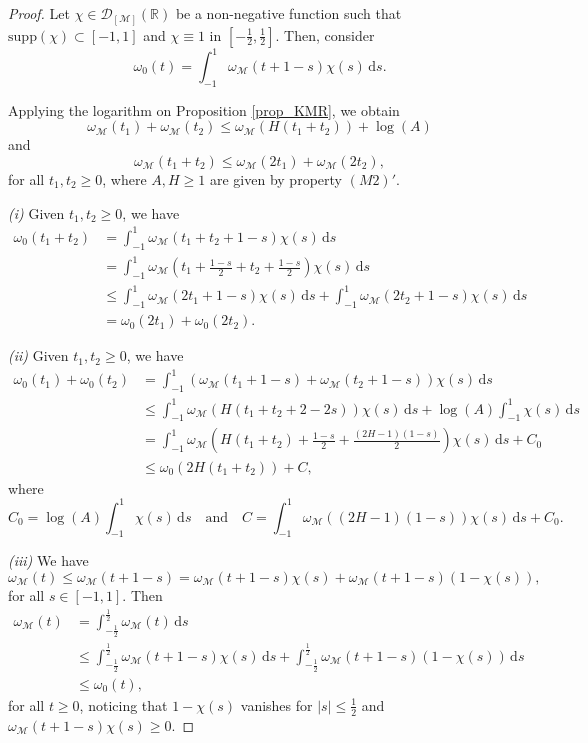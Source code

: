 \documentclass[11pt,reqno]{amsart}
\numberwithin{equation}{section}
\newcommand{\R}{{\mathbb{R}}} %
\newcommand{\D}{{\mathcal{D}}}
\newcommand{\M}{{\mathcal{M}}} %
\begin{document}
\begin{proof}
	Let $\chi\in\D_{[\M]}(\R)$ be a non-negative function such that $\mathrm{supp}(\chi)\subset [-1,1]$ and $\chi\equiv 1$ in $\left[-\frac{1}{2},\frac{1}{2}\right]$. Then, consider
	\[\omega_0(t) = \int_{-1}^1 \omega_\M(t+1-s)\chi(s)\,\mathrm{d}s.\]
	
	Applying the logarithm on Proposition \ref{prop_KMR}, we obtain
	\[\omega_\M(t_1)+\omega_\M(t_2) \leq \omega_\M(H(t_1+t_2))+\log(A)\]
	and
	\[\omega_\M(t_1+t_2) \leq \omega_\M(2t_1)+\omega_\M(2t_2),\]
	for all $t_1,t_2\geq 0$, where $A,H\geq 1$ are given by property $(M2)'$.
	
	\noindent\textit{(i)} Given $t_1,t_2\geq 0$, we have
	\begin{align*}
		\omega_0(t_1+t_2) & = \int_{-1}^1 \omega_\M(t_1+t_2+1-s)\chi(s)\,\mathrm{d}s\\
		& = \int_{-1}^1 \omega_\M\left(t_1+\frac{1-s}{2}+t_2 + \frac{1-s}{2}\right)\chi(s)\,\mathrm{d}s\\
		& \leq \int_{-1}^1\omega_\M(2t_1+1-s)\chi(s)\,\mathrm{d}s + \int_{-1}^1\omega_\M(2t_2+1-s)\chi(s)\,\mathrm{d}s\\
		& = \omega_0(2t_1)+\omega_0(2t_2).
	\end{align*}
	
	\noindent\textit{(ii)} Given $t_1,t_2\geq 0$, we have
	\begin{align*}
		\omega_0(t_1)+\omega_0(t_2) & = \int_{-1}^1 \left( \omega_\M(t_1+1-s)+\omega_\M(t_2+1-s)\right)\chi(s)\,\mathrm{d}s\\
		& \leq \int_{-1}^1 \omega_\M (H(t_1+t_2+2-2s))\chi(s)\,\mathrm{d}s + \log(A)\int_{-1}^1\chi(s)\,\mathrm{d}s\\
		& = \int_{-1}^1 \omega_\M \left(H(t_1+t_2)+\frac{1-s}{2}+\frac{(2H-1)(1-s)}{2}\right)\chi(s)\,\mathrm{d}s + C_0\\
		& \leq \omega_0(2H(t_1+t_2))+C,
	\end{align*}
	where
	\[C_0 = \log(A)\int_{-1}^1\chi(s)\,\mathrm{d}s \quad\text{and}\quad C = \int_{-1}^{1}\omega_\M((2H-1)(1-s))\chi(s)\,\mathrm{d}s + C_0.\]
	
	\noindent\textit{(iii)} We have
	\begin{equation*}
		\omega_\M(t) \leq \omega_\M(t+1-s) = \omega_\M(t+1-s)\chi(s) + \omega_\M(t+1-s)(1-\chi(s)),
	\end{equation*}
	for all $s\in[-1,1]$. Then
	\begin{align*}
		\omega_\M(t) & = \int_{-\frac{1}{2}}^{\frac{1}{2}}\omega_\M(t)\,\mathrm{d}s\\
		& \leq \int_{-\frac{1}{2}}^{\frac{1}{2}}\omega_\M(t+1-s)\chi(s)\,\mathrm{d}s + \int_{-\frac{1}{2}}^{\frac{1}{2}}\omega_\M(t+1-s)(1-\chi(s))\,\mathrm{d}s\\
		& \leq \omega_0(t),
	\end{align*}
	for all $t\geq 0$, noticing that $1-\chi(s)$ vanishes for $|s|\leq \frac{1}{2}$ and $\omega_\M(t+1-s)\chi(s)\geq 0$.
	

\end{proof}
\end{document}
